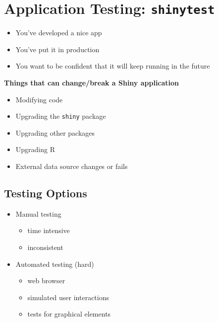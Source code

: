 \documentclass[]{book}
\providecommand{\tightlist}{%
  \setlength{\itemsep}{0pt}\setlength{\parskip}{0pt}}
\theoremstyle{definition}
\theoremstyle{definition}
\theoremstyle{definition}
\theoremstyle{remark}
\begin{document}
\hypertarget{application-testing-shinytest}{%
\chapter{\texorpdfstring{Application Testing:
\texttt{shinytest}}{Application Testing: shinytest}}\label{application-testing-shinytest}}

\begin{itemize}
\tightlist
\item
  You've developed a nice app
\item
  You've put it in production
\item
  You want to be confident that it will keep running in the future
\end{itemize}

\textbf{Things that can change/break a Shiny application}

\begin{itemize}
\tightlist
\item
  Modifying code
\item
  Upgrading the \texttt{shiny} package
\item
  Upgrading other packages
\item
  Upgrading R
\item
  External data source changes or fails
\end{itemize}

\hypertarget{testing-options}{%
\section{Testing Options}\label{testing-options}}

\begin{itemize}
\tightlist
\item
  Manual testing

  \begin{itemize}
  \tightlist
  \item
    time intensive
  \item
    inconsistent
  \end{itemize}
\item
  Automated testing (hard)

  \begin{itemize}
  \tightlist
  \item
    web browser
  \item
    simulated user interactions
  \item
    tests for graphical elements
  \end{itemize}
\end{itemize}
\end{document}
